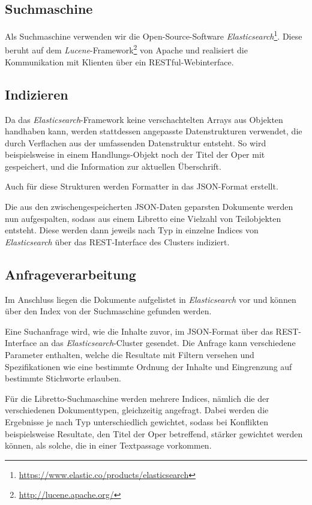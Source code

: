 \subsection{Suchmaschine}
Als Suchmaschine verwenden wir die Open-Source-Software
\emph{Elasticsearch}\footnote{\url{https://www.elastic.co/products/elasticsearch}}.
Diese beruht auf dem \emph{Lucene}-Framework\footnote{\url{http://lucene.apache.org/}} von Apache
und realisiert die Kommunikation mit Klienten
über ein RESTful-Webinterface.

\subsection{Indizieren}

Da das \emph{Elasticsearch}-Framework
keine verschachtelten Arrays aus Objekten handhaben kann,
werden stattdessen angepasste Datenstrukturen verwendet,
die durch Verflachen aus der umfassenden Datenstruktur entsteht.
So wird beispielsweise in einem Handlungs-Objekt
noch der Titel der Oper mit gespeichert,
und die Information zur aktuellen Überschrift.

Auch für diese Strukturen werden Formatter in das JSON-Format erstellt.

Die aus den zwischengespeicherten JSON-Daten geparsten Dokumente
werden nun aufgespalten, sodass aus einem Libretto eine Vielzahl von
Teilobjekten entsteht.
Diese werden dann jeweils nach Typ in einzelne Indices
von \emph{Elasticsearch} über das REST-Interface des Clusters indiziert.

\subsection{Anfrageverarbeitung}

Im Anschluss liegen die Dokumente aufgelistet in \emph{Elasticsearch} vor
und können über den Index von der Suchmaschine gefunden werden.

Eine Suchanfrage wird, wie die Inhalte zuvor,
im JSON-Format über das REST-Interface an das \emph{Elasticsearch}-Cluster gesendet.
Die Anfrage kann verschiedene Parameter enthalten,
welche die Resultate mit Filtern versehen
und Spezifikationen wie eine bestimmte Ordnung der Inhalte
und Eingrenzung auf bestimmte Stichworte erlauben.

Für die Libretto-Suchmaschine werden mehrere Indices,
nämlich die der verschiedenen Dokumenttypen,
gleichzeitig angefragt.
Dabei werden die Ergebnisse je nach Typ unterschiedlich gewichtet,
sodass bei Konflikten beispielsweise Resultate,
den Titel der Oper betreffend,
stärker gewichtet werden können,
als solche, die in einer Textpassage vorkommen.

